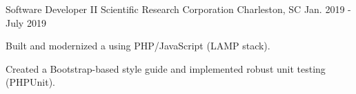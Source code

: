 \begin{cventries}
  \cventry
    {Software Developer II} %
    {Scientific Research Corporation} %
    {Charleston, SC} %
    {Jan. 2019 - July 2019} %
    {
      \begin{cvitems} %
        \item {Built and modernized a  using PHP/JavaScript (LAMP stack).}
        \item {Created a Bootstrap-based style guide and implemented robust unit testing (PHPUnit).}
      \end{cvitems}
    }



\end{cventries}
